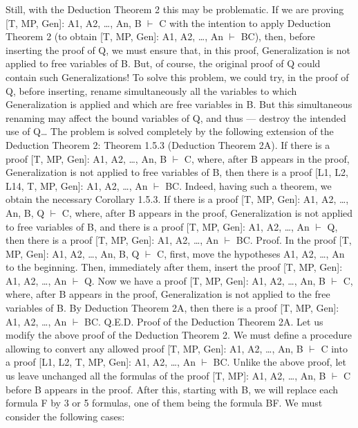 Still, with the Deduction Theorem 2 this may be problematic. If we are proving [T, MP, Gen]: A1, A2, \ldots ,
An, B \(\vdash\) C with the intention to apply Deduction Theorem 2 (to obtain [T, MP, Gen]: A1, A2, \ldots , An \(\vdash\)
B\IMPLIES C), then, before inserting the proof of Q, we must ensure that, in this proof, Generalization is not
applied to free variables of B. But, of course, the original proof of Q could contain such Generalizations!
To solve this problem, we could try, in the proof of Q, before inserting, rename simultaneously all the
variables to which Generalization is applied and which are free variables in B. But this simultaneous
renaming may affect the bound variables of Q, and thus --- destroy the intended use of Q\ldots 
The problem is solved completely by the following extension of the Deduction Theorem 2:
Theorem 1.5.3 (Deduction Theorem 2A). If there is a proof [T, MP, Gen]: A1, A2, \ldots , An, B \(\vdash\) C, where,
after B appears in the proof, Generalization is not applied to free variables of B, then there is a proof
[L1, L2, L14, T, MP, Gen]: A1, A2, \ldots , An \(\vdash\) B\IMPLIES C.
Indeed, having such a theorem, we obtain the necessary
Corollary 1.5.3. If there is a proof [T, MP, Gen]: A1, A2, \ldots , An, B, Q \(\vdash\) C, where, after B appears in the
proof, Generalization is not applied to free variables of B, and there is a proof [T, MP, Gen]: A1, A2, \ldots ,
An \(\vdash\) Q, then there is a proof [T, MP, Gen]: A1, A2, \ldots , An \(\vdash\) B\IMPLIES C.
Proof. In the proof [T, MP, Gen]: A1, A2, \ldots , An, B, Q \(\vdash\) C, first, move the hypotheses A1, A2, \ldots , An to the
beginning. Then, immediately after them, insert the proof [T, MP, Gen]: A1, A2, \ldots , An \(\vdash\) Q. Now we have
a proof [T, MP, Gen]: A1, A2, \ldots , An, B \(\vdash\) C, where, after B appears in the proof, Generalization is not
applied to the free variables of B. By Deduction Theorem 2A, then there is a proof [T, MP, Gen]: A1,
A2, \ldots , An \(\vdash\) B\IMPLIES C. Q.E.D.
Proof of the Deduction Theorem 2A. Let us modify the above proof of the Deduction Theorem 2.
We must define a procedure allowing to convert any allowed proof [T, MP, Gen]: A1, A2, \ldots , An, B \(\vdash\) C
into a proof [L1, L2, T, MP, Gen]: A1, A2, \ldots , An \(\vdash\) B\IMPLIES C.
Unlike the above proof, let us leave unchanged all the formulas of the proof [T, MP]: A1, A2, \ldots , An, B \(\vdash\)
C before B appears in the proof. After this, starting with B, we will replace each formula F by 3 or 5
formulas, one of them being the formula B\IMPLIES F.
We must consider the following cases:
